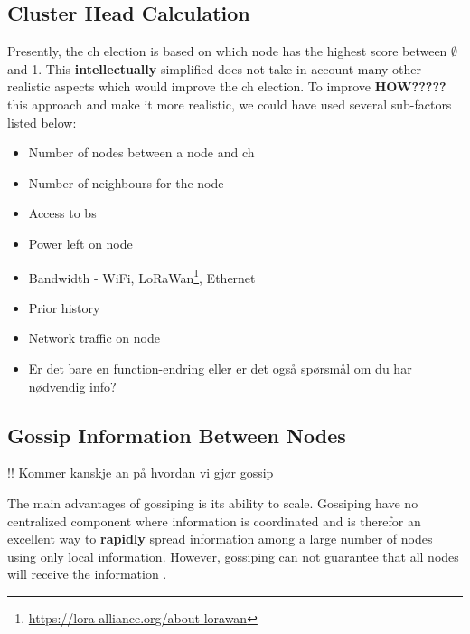 \documentclass[USenglish]{uit-thesis}
\begin{document}
\subsection{Cluster Head Calculation} \label{ssec:ch_election}
Presently, the \gls{ch} election is based on which node has the highest score between $\emptyset$ and 1. This \textbf{intellectually} simplified does not take in account many other realistic aspects which would improve the \gls{ch} election. To improve \textbf{HOW?????} this approach and make it more realistic, we could have used several sub-factors listed below:


\begin{itemize}
\item Number of nodes between a node and \gls{ch}
\item Number of neighbours for the node
\item Access to \gls{bs}
\item Power left on node
\item Bandwidth - WiFi, LoRaWan\footnote{\url{https://lora-alliance.org/about-lorawan}}, Ethernet
\item Prior history
\item Network traffic on node
\item Er det bare en function-endring eller er det også spørsmål om du har nødvendig info?
\end{itemize}



\subsection{Gossip Information Between Nodes}
!! Kommer kanskje an på hvordan vi gjør gossip


The main advantages of gossiping is its ability to scale. Gossiping have no centralized component where information is coordinated and is therefor an excellent way to \textbf{rapidly} spread information among a large number of nodes using only local information. However, gossiping can not guarantee that all nodes will receive the information \cite{demers}.
\end{document}
